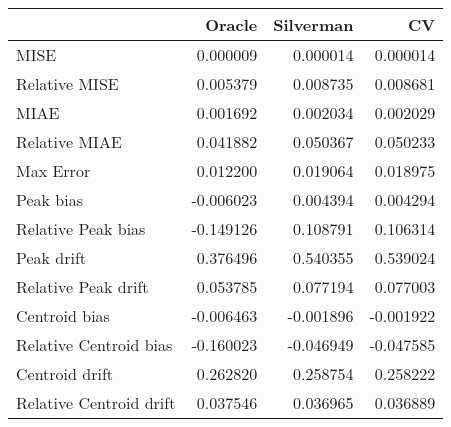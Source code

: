 \begin{tabular}{lrrr}
  \hline
 & Oracle & Silverman & CV \\ 
  \hline
MISE & 0.000009 & 0.000014 & 0.000014 \\ 
  Relative MISE & 0.005379 & 0.008735 & 0.008681 \\ 
  MIAE & 0.001692 & 0.002034 & 0.002029 \\ 
  Relative MIAE & 0.041882 & 0.050367 & 0.050233 \\ 
  Max Error & 0.012200 & 0.019064 & 0.018975 \\ 
  Peak bias & -0.006023 & 0.004394 & 0.004294 \\ 
  Relative Peak bias & -0.149126 & 0.108791 & 0.106314 \\ 
  Peak drift & 0.376496 & 0.540355 & 0.539024 \\ 
  Relative Peak drift & 0.053785 & 0.077194 & 0.077003 \\ 
  Centroid bias & -0.006463 & -0.001896 & -0.001922 \\ 
  Relative Centroid bias & -0.160023 & -0.046949 & -0.047585 \\ 
  Centroid drift & 0.262820 & 0.258754 & 0.258222 \\ 
  Relative Centroid drift & 0.037546 & 0.036965 & 0.036889 \\ 
   \hline
\end{tabular}
